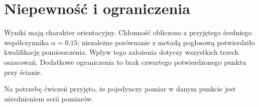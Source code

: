 \section*{Niepewność i ograniczenia}
Wyniki mają charakter orientacyjny. Chłonność obliczono z przyjętego
średniego współczynnika $\alpha=\num{0.15}$; niezależne porównanie
z metodą pogłosową potwierdziło kwalifikację pomieszczenia.
Wpływ tego założenia dotyczy wszystkich trzech oszacowań. Dodatkowe
ograniczenia to  brak czwartego potwierdzonego punktu przy ścianie.

Na potrzebę ćwiczeń przyjęto, że pojedynczy pomiar w danym punkcie jest uśrednieniem serii pomiarów.
